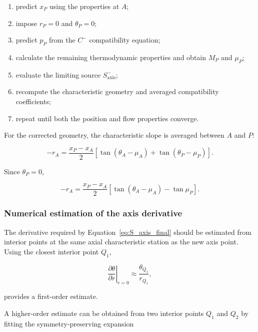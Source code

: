 \begin{enumerate}
    \item predict \(x_P\) using the properties at \(A\);
    \item impose \(r_P=0\) and \(\theta_P=0\);
    \item predict \(p_P\) from the \(C^-\) compatibility equation;
    \item calculate the remaining thermodynamic properties and obtain
    \(M_P\) and \(\mu_P\);
    \item evaluate the limiting source
    \(S^-_{\mathrm{axis}}\);
    \item recompute the characteristic geometry and averaged
    compatibility coefficients;
    \item repeat until both the position and flow properties converge.
\end{enumerate}

For the corrected geometry, the characteristic slope is averaged
between \(A\) and \(P\):

\begin{equation}
-r_A
=
\frac{x_P-x_A}{2}
\left[
\tan(\theta_A-\mu_A)
+
\tan(\theta_P-\mu_P)
\right].
\end{equation}

Since \(\theta_P=0\),

\begin{equation}
\boxed{
-r_A
=
\frac{x_P-x_A}{2}
\left[
\tan(\theta_A-\mu_A)
-
\tan\mu_P
\right]
}.
\label{eq:axis_corrected_geometry}
\end{equation}

\subsubsection{Numerical estimation of the axis derivative}

The derivative required by Equation~\eqref{eq:S_axis_final} should be
estimated from interior points at the same axial characteristic station
as the new axis point. Using the closest interior point \(Q_1\),

\begin{equation}
\left.
\frac{\partial\theta}{\partial r}
\right|_{r=0}
\approx
\frac{\theta_{Q_1}}{r_{Q_1}},
\label{eq:axis_derivative_first_order}
\end{equation}

provides a first-order estimate.

A higher-order estimate can be obtained from two interior points
\(Q_1\) and \(Q_2\) by fitting the symmetry-preserving expansion

